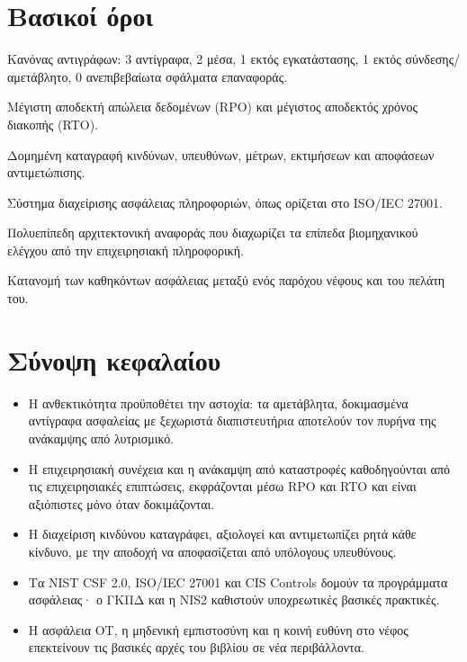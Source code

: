 \documentclass[11pt,openany]{book}
\begin{document}
\section*{Βασικοί όροι}
\begin{description}[style=nextline,leftmargin=1.2em]
  \item[3-2-1-1-0] Κανόνας αντιγράφων: 3 αντίγραφα, 2 μέσα, 1 εκτός εγκατάστασης, 1 εκτός σύνδεσης/αμετάβλητο, 0 ανεπιβεβαίωτα σφάλματα επαναφοράς.
  \item[RPO / RTO] Μέγιστη αποδεκτή απώλεια δεδομένων (RPO) και μέγιστος αποδεκτός χρόνος διακοπής (RTO).
  \item[Μητρώο κινδύνων] Δομημένη καταγραφή κινδύνων, υπευθύνων, μέτρων, εκτιμήσεων και αποφάσεων αντιμετώπισης.
  \item[ΣΔΑΠ (ISMS)] Σύστημα διαχείρισης ασφάλειας πληροφοριών, όπως ορίζεται στο ISO/IEC 27001.
  \item[Μοντέλο Purdue] Πολυεπίπεδη αρχιτεκτονική αναφοράς που διαχωρίζει τα επίπεδα βιομηχανικού ελέγχου από την επιχειρησιακή πληροφορική.
  \item[Κοινή ευθύνη] Κατανομή των καθηκόντων ασφάλειας μεταξύ ενός παρόχου νέφους και του πελάτη του.
\end{description}

\section*{Σύνοψη κεφαλαίου}
\begin{itemize}
  \item Η ανθεκτικότητα προϋποθέτει την αστοχία: τα αμετάβλητα, δοκιμασμένα αντίγραφα ασφαλείας με ξεχωριστά διαπιστευτήρια αποτελούν τον πυρήνα της ανάκαμψης από λυτρισμικό.
  \item Η επιχειρησιακή συνέχεια και η ανάκαμψη από καταστροφές καθοδηγούνται από τις επιχειρησιακές επιπτώσεις, εκφράζονται μέσω RPO και RTO και είναι αξιόπιστες μόνο όταν δοκιμάζονται.
  \item Η διαχείριση κινδύνου καταγράφει, αξιολογεί και αντιμετωπίζει ρητά κάθε κίνδυνο, με την αποδοχή να αποφασίζεται από υπόλογους υπευθύνους.
  \item Τα NIST CSF 2.0, ISO/IEC 27001 και CIS Controls δομούν τα προγράμματα ασφάλειας· ο ΓΚΠΔ και η NIS2 καθιστούν υποχρεωτικές βασικές πρακτικές.
  \item Η ασφάλεια OT, η μηδενική εμπιστοσύνη και η κοινή ευθύνη στο νέφος επεκτείνουν τις βασικές αρχές του βιβλίου σε νέα περιβάλλοντα.
\end{itemize}
\end{document}
